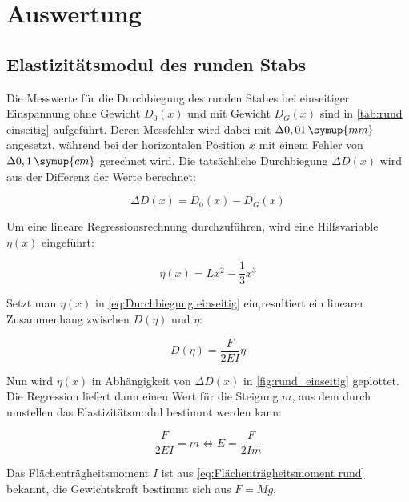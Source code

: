 \section{Auswertung}
\label{sec:Auswertung}

\subsection{Elastizitätsmodul des runden Stabs}  %
\label{sec:Elastizitätsmodul rund}

Die Messwerte für die Durchbiegung des runden Stabes bei einseitiger Einspannung ohne Gewicht $D_{0}(x)$
und mit Gewicht $D_{G}(x)$ sind in \autoref{tab:rund einseitig} aufgeführt.
Deren Messfehler wird dabei mit $\Delta 0,01\,\symup{mm}$ angesetzt, während bei der horizontalen Position
$x$ mit einem Fehler von $\Delta 0,1\,\symup{cm}$ gerechnet wird.
Die tatsächliche Durchbiegung $\Delta D(x)$ wird aus der Differenz der Werte berechnet:

\begin{equation}
  \Delta D(x)= D_{0}(x)-D_{G}(x)
  \label{eq:Delta D}
\end{equation}


Um eine lineare Regressionsrechnung durchzuführen, wird eine Hilfsvariable $\eta(x)$ eingeführt:

\begin{equation}
  \eta(x)=Lx^{2}-\frac{1}{3}x^{3}
  \label{eq:eta einseitig rund}
\end{equation}

Setzt man $\eta(x)$ in \autoref{eq:Durchbiegung einseitig} ein,resultiert ein linearer Zusammenhang zwischen $D(\eta)$ und $\eta$:

\begin{equation}
  D(\eta)=\frac{F}{2EI}\eta
  \label{eq:Geradengleichung}
\end{equation}

Nun wird $\eta(x)$ in Abhängigkeit von $\Delta D(x)$ in \autoref{fig:rund_einseitig} geplottet.
Die Regression liefert dann einen Wert für die Steigung $m$, aus dem durch umstellen das Elastizitätsmodul bestimmt werden kann:

\begin{equation}
  \frac{F}{2EI}=m \Leftrightarrow E=\frac{F}{2Im}
  \label{eq:Elastizitätsmodul aus Steigung}
\end{equation}

Das Flächenträgheitsmoment $I$ ist aus \autoref{eq:Flächenträgheitsmoment rund} bekannt, die Gewichtskraft
bestimmt sich aus $F=Mg$.

